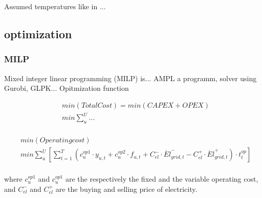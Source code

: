 \documentclass{article}
\begin{document}
Assumed temperatures like in ...


\subsection{optimization}

\subsubsection{MILP}
Mixed integer linear programming (MILP) is... 
AMPL a programm, solver using Gurobi, GLPK...
Opitmization function

\begin{align}
	& min \left( TotalCost \right)  = min \left(  CAPEX + OPEX \right) \\
	& min \sum_{u}^{U} ... \\
\end{align}

\begin{align}
	& min \left( Operating cost \right) \\
	& min \sum_{u}^{U} \left[ \sum_{t = 1}^{T} \left( c_{u}^{op1} \cdot y_{u,t} + c_{u}^{op2} \cdot f_{u,t} + C_{el}^{-} \cdot \dot{El}_{grid,t}^{-} - C_{el}^{+} \cdot \dot{El}_{grid,t}^{+} \right) \cdot t_{t}^{op} \right] \\
\end{align}

where $c_{u}^{op1}$ and $c_{u}^{op1}$ are the respectively the fixed and the variable operating cost, and $C_{el}^{-}$ and $C_{el}^{+}$ are the buying and selling price of electricity.
%
%
\end{document}
